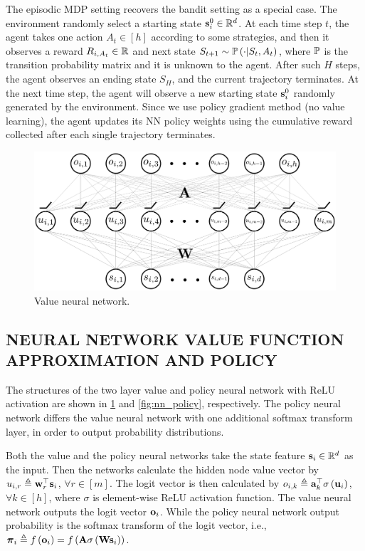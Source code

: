 The episodic MDP setting recovers the bandit setting as a special case. The environment randomly select a starting state ${\mathbf{s}}_i^0 \in {\mathbb{R}}^d$. At each time step $t$, the agent takes one action $A_t \in [h]$ according to some strategies, and then it observes a reward $R_{i, A_t} \in {\mathbb{R}}$ and next state $S_{t+1} \sim {\mathbb{P}}\left( \cdot \middle| S_t, A_t \right)$, where ${\mathbb{P}}$ is the transition probability matrix and it is unknown to the agent. After such $H$ steps, the agent observes an ending state $S_H$, and the current trajectory terminates. At the next time step, the agent will observe a new starting state ${\mathbf{s}}_i^0$ randomly generated by the environment. Since we use policy gradient method (no value learning), the agent updates its NN policy weights using the cumulative reward collected after each single trajectory terminates.

\begin{figure}[t]
\vskip 0.2in
\begin{center}
\centerline{\includegraphics[width=\columnwidth]{nn_value.pdf}}
\caption{Value neural network.}
\label{fig:nn_value}
\end{center}
\vskip -0.2in
\end{figure}

\subsection{NEURAL NETWORK VALUE FUNCTION APPROXIMATION AND POLICY}
\label{subsec:nn_value_policy}

The structures of the two layer value and policy neural network with ReLU activation are shown in \cref{fig:nn_value} and \cref{fig:nn_policy}, respectively. The policy neural network differs the value neural network with one additional softmax transform layer, in order to output probability distributions. 

Both the value and the policy neural networks take the state feature  ${\mathbf{s}}_i \in {\mathbb{R}}^d$ as the input. Then the networks calculate the hidden node value vector by $u_{i,r} \triangleq {\mathbf{w}}_r^\top {\mathbf{s}}_i$, $\forall r \in [m]$. The logit vector is then calculated by $o_{i,k} \triangleq {\mathbf{a}}_k^\top \sigma\left( {\mathbf{u}}_i \right)$, $\forall k \in [h]$, where $\sigma$ is element-wise ReLU activation function. The value neural network outputs the logit vector ${\mathbf{o}}_i$. While the policy neural network output probability is the softmax transform of the logit vector, i.e., ${\boldsymbol{\pi}}_i \triangleq f\left( {\mathbf{o}}_i \right) = f\left( {\mathbf{A}} \sigma\left( {\mathbf{W}} {\mathbf{s}}_i \right) \right)$. 

